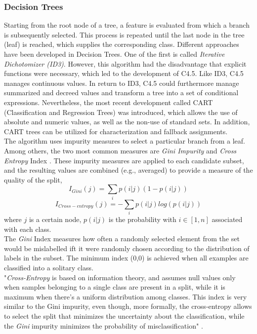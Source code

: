 \documentclass[a4paper, 11pt,titlepage,oneside,openany]{book}
\begin{document}
\subsubsection{Decision Trees}
Starting from the root node of a tree, a feature is evaluated from which a branch is subsequently selected. This process is repeated until the last node in the tree (leaf) is reached, which supplies the corresponding class. Different approaches have been developed in Decision Trees. One of the first is called \textit{Iterative Dichotomizer (ID3)}. However, this algorithm had the disadvantage that explicit functions were necessary, which led to the development of C4.5. Like ID3, C4.5 manages continuous values. In return to ID3, C4.5 could furthermore manage summarized and decreed values and transform a tree into a set of conditional expressions. Nevertheless, the most recent development called CART (Classification and Regression Trees) was introduced, which allows the use of absolute and numeric values, as well as the non-use of standard sets. In addition, CART trees can be utilized for characterization and fallback assignments. \cite{algorithms2}\\
\noindent The algorithm uses impurity measures to select a particular branch from a leaf. Among others, the two most common measures are \textit{Gini Impurity} and \textit{Cross Entropy} Index \cite{algorithms}. 
\newpage
\noindent These impurity measures are  applied to each candidate subset, and the resulting values are combined (e.g., averaged) to provide a measure of the quality of the split,
\[
I_{Gini}(j)=\sum_{i}p(i|j)(1-p(i|j))
\]
\[
I_{Cross-entropy}(j)=-\sum_{i}p(i|j)log(p(i|j))
\]
where $j$ is a certain node, $p(i|j)$ is the probability with $i \in [1,n]$ associated with each class.\\
\noindent The \textit{Gini} Index measures how often a randomly selected element from the set would be mislabelled ift it were randomly chosen according to the distribution of labels in the subset. The minimum index (0,0) is achieved when all examples are classified into a solitary class.\\
\noindent "\textit{Cross-Entropy} is based on information theory, and assumes null values only when samples belonging to a single class are present in a split, while it is maximum when there's a uniform distribution among classes. This index is very similar to the Gini impurity, even though, more formally, the cross-entropy allows to select the split that minimizes the uncertainty about the classification, while the \textit{Gini} impurity minimizes the probability of misclassification" \cite{algorithms}.
\end{document}
